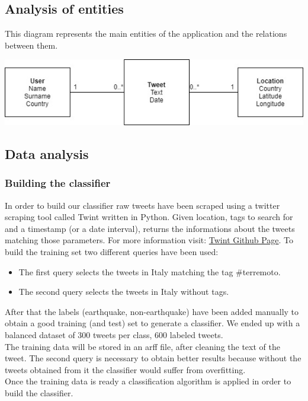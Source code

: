 \documentclass[a4paper, oneside]{article}
\begin{document}
\subsection{Analysis of entities}
This diagram represents the main entities of the application and the relations between them.
\begin{minipage}{\linewidth}
\begin{center}
\vspace{4mm}
\includegraphics[width = 1\textwidth]{./images/diagrams/Uml Analysis diagram} 
\vspace{2mm}
\label{fig:useCases}
\end{center}
\end{minipage}

\clearpage
\subsection{Data analysis}
\subsubsection{Building the classifier}
In order to build our classifier raw tweets have been scraped using a twitter scraping tool called Twint written in Python. Given location, tags to search for and a timestamp  (or a date interval), returns the informations about the tweets matching those parameters. For more information visit: \textcolor{blue}{\href{https://www.github.com/twintproject/twint}{Twint Github Page}}. To build the training set two different queries have been used: 
\begin{itemize}
\item The first query selects the tweets in Italy matching the tag {\#}terremoto.
\item The second query selects the tweets in Italy without tags.
\end{itemize} 
After that the labels (earthquake, non-earthquake) have been added manually to obtain a good training (and test) set to generate a classifier. We ended up with a balanced dataset of 300 tweets per class, 600 labeled tweets.\\
The training data will be stored in an arff file, after cleaning the text of the tweet. The second query is necessary to obtain better results because without the tweets obtained from it the classifier would suffer from overfitting.\\
Once the training data is ready a classification algorithm is applied in order to build the classifier.
\end{document}
